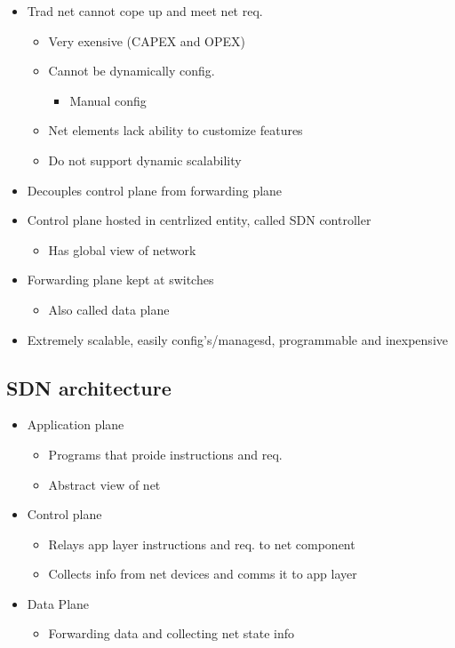 \begin{itemize}
	\item Trad net cannot cope up and meet net req.
	\begin{itemize}
		\item Very exensive (CAPEX and OPEX)
		\item Cannot be dynamically config.
		\begin{itemize}
			\item Manual config
		\end{itemize}
		\item Net elements lack ability to customize features
		\item Do not support dynamic scalability
	\end{itemize}
	\item Decouples control plane from forwarding plane
	\item Control plane hosted in centrlized entity, called SDN controller
	\begin{itemize}
		\item Has global view of network
	\end{itemize}
	\item Forwarding plane kept at switches
	\begin{itemize}
		\item Also called data plane
	\end{itemize}
	\item Extremely scalable, easily config's/managesd, programmable and
		inexpensive
\end{itemize}

\subsection{SDN architecture}

\begin{itemize}
	\item Application plane
	\begin{itemize}
		\item Programs that proide instructions and req.
		\item Abstract view of net
	\end{itemize}
	\item Control plane
	\begin{itemize}
		\item Relays app layer instructions and req. to net component
		\item Collects info from net devices and comms it to app layer
	\end{itemize}
	\item Data Plane
	\begin{itemize}
		\item Forwarding data and collecting net state info
	\end{itemize}
\end{itemize}

